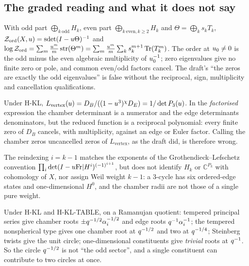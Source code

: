 \subsection{The graded reading and what it does not say}
\begin{theorem}
\label{thm:graded-superdeterminant}
With odd part $\bigoplus_{k\ \mathrm{odd}}H_k$, even part
$\bigoplus_{k\ \mathrm{even},k\ge2}H_k$ and $\Theta = \bigoplus_ks_kT_k$,
$\mathcal Z_{\mathrm{ord}}(X,u) = \operatorname{sdet}(I-u\Theta)^{-1}$ and
$\log\mathcal Z_{\mathrm{ord}} = \sum_m\frac{u^m}{m}\operatorname{str}(\Theta^m)
= \sum_m\frac{u^m}{m}\sum_ks_k^{m+1}\operatorname{Tr}(T_k^m)$. The order at $u_0\ne0$ is
the odd minus the even algebraic multiplicity of $u_0^{-1}$; zero eigenvalues
give no finite zero or pole, and common even/odd factors cancel. The draft's
``the zeros are exactly the odd eigenvalues'' is false without the reciprocal,
sign, multiplicity and cancellation qualifications.
\end{theorem}

\begin{proposition}
\label{prop:vertex-l-no-zeros}
Under H-KL, $L_{\mathrm{vertex}}(u) = D_B/((1-u^3)^{\chi}D_E) = 1/\det
P_3(u)$. In the \emph{factorised} expression the chamber determinant is a
numerator and the edge determinants denominators, but the reduced function is a
reciprocal polynomial: every finite zero of $D_B$ cancels, with multiplicity,
against an edge or Euler factor. Calling the chamber zeros uncancelled zeros of
$L_{\mathrm{vertex}}$, as the draft did, is therefore wrong.
\end{proposition}

\begin{proposition}
\label{prop:parity-only}
The reindexing $i = k-1$ matches the exponents of the Grothendieck--Lefschetz
convention $\prod_i\det(I-u\mathrm{Fr}|H^i)^{(-1)^{i+1}}$, but does not identify
$H_k$ or $\mathbb C^{P_k}$ with cohomology of $X$, nor assign Weil weight $k-1$:
a $3$-cycle has six ordered-edge states and one-dimensional $H^0$, and the
chamber radii are not those of a single pure weight.
\end{proposition}

\begin{proposition}
\label{prop:three-circles}
Under H-KL and H-KL-TABLE, on a Ramanujan quotient: tempered principal series
give chamber roots $\pm q^{-1/2}\alpha_i^{-1/2}$ and edge roots %
$q^{-1}\alpha_i^{-1}$; the tempered nonspherical type gives one chamber root %
at $q^{-1/2}$ and two at $q^{-1/4}$; Steinberg twists give the unit circle;
one-dimensional constituents give \emph{trivial} roots at $q^{-1}$. So the
circle $q^{-1/2}$ is not ``the odd sector'', and a single constituent can
contribute to two circles at once.
\end{proposition}

